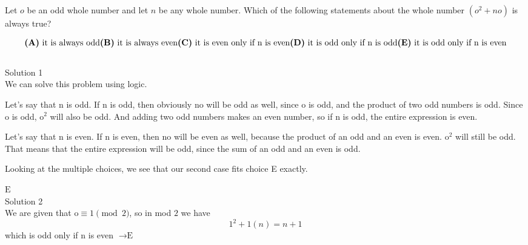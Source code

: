

Let $ o$ be an odd whole number and let $ n$ be any whole number. Which of the following statements about the whole number $ (o^2+no)$ is always true?

\[ \textbf{(A)}\ \text{it is always odd} \\
\textbf{(B)}\ \text{it is always even} \\
\textbf{(C)}\ \text{it is even only if n is even} \\
\textbf{(D)}\ \text{it is odd only if n is odd} \\
\textbf{(E)}\ \text{it is odd only if n is even}
\]
\\
Solution 1
\\
We can solve this problem using logic.

Let's say that $\text{n}$ is odd. If $\text{n}$ is odd, then obviously $\text{no}$ will be odd as well, since $\text{o}$ is odd, and the product of two odd numbers is odd. Since $\text{o}$ is odd,  $\text{o}^2$ will also be odd. And adding two odd numbers makes an even number, so if $\text{n}$ is odd, the entire expression is even.

Let's say that $\text{n}$ is even. If $\text{n}$ is even, then $\text{no}$ will be even as well, because the product of an odd and an even is even. $\text{o}^2$ will still be odd. That means that the entire expression will be odd, since the sum of an odd and an even is odd.

Looking at the multiple choices, we see that our second case fits choice E exactly.

$\boxed{\text{E}}$
\\
Solution 2
\\
We are given that $\text{o}\equiv 1\pmod{2}$, so in mod $2$ we have \[1^2+1(n) = n+1\] which is odd only if $\text{n}$ is even $\rightarrow \boxed{\text{E}}$